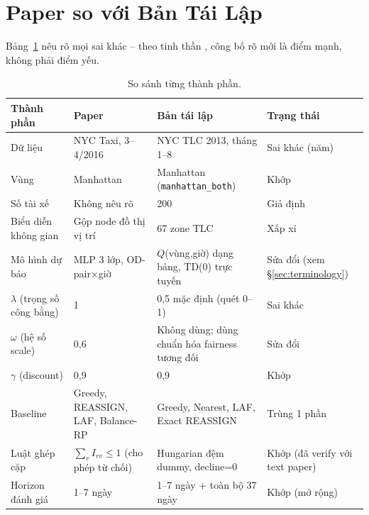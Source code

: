 \documentclass[10pt,twocolumn,a4paper]{article}
\begin{document}
\section{Paper so với Bản Tái Lập}
Bảng~\ref{tab:papervsrepl} nêu rõ mọi sai khác -- theo tinh thần
\citet{fairdispatch2024}, công bố rõ mới là điểm mạnh, không phải điểm yếu.

\begin{table}[t]
\centering
\caption{So sánh từng thành phần.}
\label{tab:papervsrepl}
\footnotesize
\begin{tabularx}{\textwidth}{@{}lXXl@{}}
\toprule
Thành phần & Paper & Bản tái lập & Trạng thái \\
\midrule
Dữ liệu & NYC Taxi, 3--4/2016 & NYC TLC 2013, tháng 1--8 & Sai khác (năm) \\
Vùng & Manhattan & Manhattan (\texttt{manhattan\_both}) & Khớp \\
Số tài xế & Không nêu rõ & 200 & Giả định \\
Biểu diễn không gian & Gộp node đồ thị vị trí & 67 zone TLC & Xấp xỉ \\
Mô hình dự báo & MLP 3 lớp, OD-pair$\times$giờ & $Q$(vùng,giờ) dạng bảng, TD(0) trực tuyến & Sửa đổi (xem \S\ref{sec:terminology}) \\
$\lambda$ (trọng số công bằng) & 1 & 0,5 mặc định (quét 0--1) & Sai khác \\
$\omega$ (hệ số scale) & 0,6 & Không dùng; dùng chuẩn hóa fairness tương đối & Sửa đổi \\
$\gamma$ (discount) & 0,9 & 0,9 & Khớp \\
Baseline & Greedy, REASSIGN, LAF, Balance-RP & Greedy, Nearest, LAF, Exact REASSIGN & Trùng 1 phần \\
Luật ghép cặp & $\sum_v I_{rv}\le1$ (cho phép từ chối) & Hungarian đệm dummy, decline=0 & Khớp (đã verify với text paper) \\
Horizon đánh giá & 1--7 ngày & 1--7 ngày + toàn bộ 37 ngày & Khớp (mở rộng) \\
\bottomrule
\end{tabularx}
\end{table}
\end{document}

